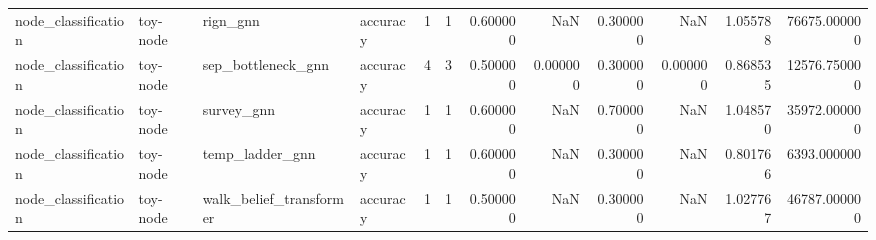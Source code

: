 \begin{tabular}{llllrrrrrrrr}
node_classification & toy-node & rign_gnn & accuracy & 1 & 1 & 0.600000 & NaN & 0.300000 & NaN & 1.055788 & 76675.000000 \\
node_classification & toy-node & sep_bottleneck_gnn & accuracy & 4 & 3 & 0.500000 & 0.000000 & 0.300000 & 0.000000 & 0.868535 & 12576.750000 \\
node_classification & toy-node & survey_gnn & accuracy & 1 & 1 & 0.600000 & NaN & 0.700000 & NaN & 1.048570 & 35972.000000 \\
node_classification & toy-node & temp_ladder_gnn & accuracy & 1 & 1 & 0.600000 & NaN & 0.300000 & NaN & 0.801766 & 6393.000000 \\
node_classification & toy-node & walk_belief_transformer & accuracy & 1 & 1 & 0.500000 & NaN & 0.300000 & NaN & 1.027767 & 46787.000000 \\
\bottomrule
\end{tabular}
